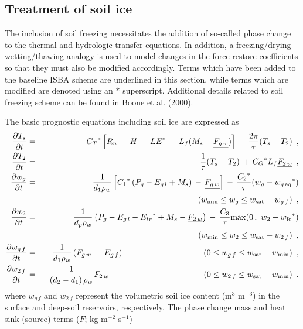 \subsection{Treatment of soil ice}

The inclusion of soil freezing necessitates the addition
of so-called phase change to the thermal and hydrologic
transfer equations. In addition,
a freezing/drying wetting/thawing analogy is
used to model changes in the force-restore coefficients
so that they must also be modified accordingly. Terms which have been
added to the baseline ISBA scheme are underlined in this
section, while terms which are modified are denoted using
an $\ast$ superscript.
Additional details related to soil freezing
scheme can be found in Boone et al. (2000).

The basic prognostic equations
including soil ice are expressed as
%
\begin{eqnarray}
{\partial T_s\over\partial t} &=&
{C_T}^\ast \left[ R_n \,-\, H \,-\, {LE}^\ast \,-\,
L_f(M_s-{\underline{F_{g\,w}}})\right] \,-\,
{2\pi\over\tau}(T_s-T_2)
\,\,\,, \\
%
{\partial T_2\over\partial t} &=&
{1\over\tau}(T_s-T_2)
\,+\,{C_G}^\ast L_f {\underline{F_{2\,w}}}
\,\,\,, \\
%
{\partial w_g\over\partial t} &=&
{1\over d_1\rho_w} \left[ {C_1}^\ast\left(P_g-E_{g\,l}+M_s \right)
\,-\, {\underline{F_{g\,w}}} \right]
\,-\, {{C_2}^\ast\over\tau}(w_g-{w_{g\,{\rm eq}}}^\ast) \\
& & \hskip2.6in
(w_{{\rm min}} \leq w_g \leq w_{\rm sat}-w_{g\,f})
\,\,\,, \\
%
{\partial w_2\over\partial t} &=&
{1\over d_p\rho_w}
\left(P_g-{E_{g\,l}}-{E_{tr}}^\ast+M_s-
{\underline{F_{2\,w}}} \right) \,-\,{C_3\over\tau}{\rm max}
(0\,,\,\,w_2-{w_{\rm fc}}^\ast) \\
& & \hskip2.6in
(w_{{\rm min}}\leq w_2 \leq w_{\rm sat}-w_{2\,f})
\,\,\,, \\
%
{\partial w_{g\,f}\over\partial t} &=&
{1\over d_1 \rho_w} \left(
F_{g\,w} \,-\, E_{g\,f} \right)
\hskip1.35in
(0 \leq w_{g\,f}\leq w_{\rm sat}-w_{{\rm min}} )
\,\,\,, \\
%
{\partial w_{2\,f}\over\partial t} &=&
{1\over \left(d_2-d_1\right)\rho_w} F_{2\,w}
\hskip1.6in
(0 \leq w_{2\,f}\leq w_{\rm sat}-w_{{\rm min}} )
\,\,\,.
\end{eqnarray}
%
where $w_{g\,f}$ and $w_{2\,f}$ represent the volumetric soil ice content
(m$^3$ m$^{-3}$) in the surface and deep-soil reservoirs, respectively.
The phase change mass and heat sink (source) terms ($F$; kg m$^{-2}$ s$^{-1}$)
